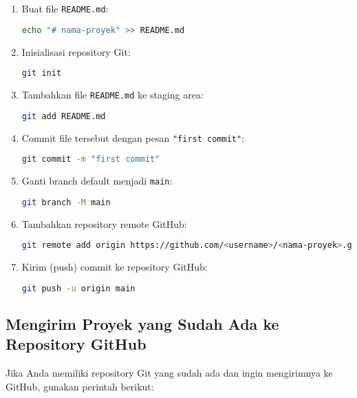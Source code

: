 \begin{enumerate}
	\item Buat file \texttt{README.md}:
	\begin{lstlisting}[language=bash]
		echo "# nama-proyek" >> README.md
	\end{lstlisting}
	
	\item Inisialisasi repository Git:
	\begin{lstlisting}[language=bash]
		git init
	\end{lstlisting}
	
	\item Tambahkan file \texttt{README.md} ke staging area:
	\begin{lstlisting}[language=bash]
		git add README.md
	\end{lstlisting}
	
	\item Commit file tersebut dengan pesan \texttt{"first commit"}:
	\begin{lstlisting}[language=bash]
		git commit -m "first commit"
	\end{lstlisting}
	
	\item Ganti branch default menjadi \texttt{main}:
	\begin{lstlisting}[language=bash]
		git branch -M main
	\end{lstlisting}
	
	\item Tambahkan repository remote GitHub:
	\begin{lstlisting}[language=bash]
		git remote add origin https://github.com/<username>/<nama-proyek>.git
	\end{lstlisting}
	
	\item Kirim (push) commit ke repository GitHub:
	\begin{lstlisting}[language=bash]
		git push -u origin main
	\end{lstlisting}
\end{enumerate}

\subsection{Mengirim Proyek yang Sudah Ada ke Repository GitHub}

Jika Anda memiliki repository Git yang sudah ada dan ingin mengirimnya ke GitHub, gunakan perintah berikut:

